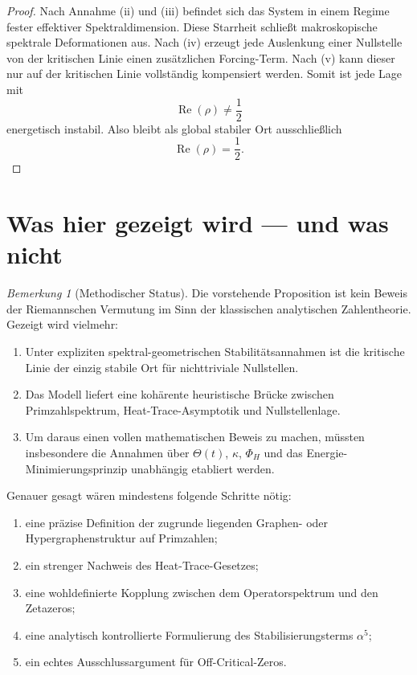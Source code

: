 \documentclass[11pt,a4paper]{article}
\theoremstyle{plain}
\theoremstyle{definition}
\theoremstyle{remark}
\newtheorem{bemerkung}[satz]{Bemerkung}
\newcommand{\RePart}{\operatorname{Re}}
\newcommand{\kappaF}{\kappa}
\newcommand{\ThetaH}{\Theta}
\begin{document}
	\begin{proof}
		Nach Annahme (ii) und (iii) befindet sich das System in einem Regime fester effektiver Spektraldimension. Diese Starrheit schließt makroskopische spektrale Deformationen aus. Nach (iv) erzeugt jede Auslenkung einer Nullstelle von der kritischen Linie einen zusätzlichen Forcing-Term. Nach (v) kann dieser nur auf der kritischen Linie vollständig kompensiert werden. Somit ist jede Lage mit
		\[
		\RePart(\rho)\neq \frac12
		\]
		energetisch instabil. Also bleibt als global stabiler Ort ausschließlich
		\[
		\RePart(\rho)=\frac12.
		\]
	\end{proof}
	
	\section{Was hier gezeigt wird --- und was nicht}
	
	\begin{bemerkung}[Methodischer Status]
		Die vorstehende Proposition ist kein Beweis der Riemannschen Vermutung im Sinn der klassischen analytischen Zahlentheorie. Gezeigt wird vielmehr:
		\begin{enumerate}[label=\arabic*.]
			\item Unter expliziten spektral-geometrischen Stabilitätsannahmen ist die kritische Linie der einzig stabile Ort für nichttriviale Nullstellen.
			\item Das Modell liefert eine kohärente heuristische Brücke zwischen Primzahlspektrum, Heat-Trace-Asymptotik und Nullstellenlage.
			\item Um daraus einen vollen mathematischen Beweis zu machen, müssten insbesondere die Annahmen über $\ThetaH(t)$, $\kappaF$, $\Phi_H$ und das Energie-Minimierungsprinzip unabhängig etabliert werden.
		\end{enumerate}
	\end{bemerkung}
	
	Genauer gesagt wären mindestens folgende Schritte nötig:
	\begin{enumerate}[label=\alph*)]
		\item eine präzise Definition der zugrunde liegenden Graphen- oder Hypergraphenstruktur auf Primzahlen;
		\item ein strenger Nachweis des Heat-Trace-Gesetzes;
		\item eine wohldefinierte Kopplung zwischen dem Operatorspektrum und den Zetazeros;
		\item eine analytisch kontrollierte Formulierung des Stabilisierungsterms $\alpha^5$;
		\item ein echtes Ausschlussargument für Off-Critical-Zeros.
	\end{enumerate}
	
\end{document}
